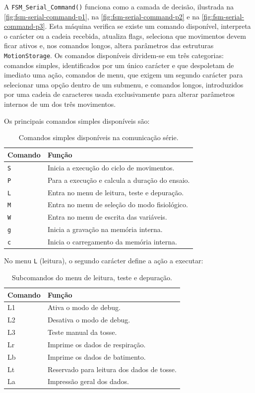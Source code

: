 \clearpage
A \texttt{FSM\_Serial\_Command()} funciona como a camada de decisão, ilustrada na \cref{fig:fsm-serial-command-p1}, na \cref{fig:fsm-serial-command-p2} e na \cref{fig:fsm-serial-command-p3}. Esta máquina verifica se existe um comando disponível, interpreta o carácter ou a cadeia recebida, atualiza flags, seleciona que movimentos devem ficar ativos e, nos comandos longos, altera parâmetros das estruturas \texttt{MotionStorage}. Os comandos disponíveis dividem-se em três categorias: comandos simples, identificados por um único carácter e que despoletam de imediato uma ação, comandos de menu, que exigem um segundo carácter para selecionar uma opção dentro de um submenu, e comandos longos, introduzidos por uma cadeia de caracteres usada exclusivamente para alterar parâmetros internos de um dos três movimentos.

Os principais comandos simples disponíveis são:

\begin{table}[H]
  \centering
  \caption{Comandos simples disponíveis na comunicação série.}
  \label{tab:comandos-simples}
  \begin{tabular}{@{}ll@{}}
    \toprule
    Comando & Função\\
    \midrule
    \texttt{S} & Inicia a execução do ciclo de movimentos.\\
    \texttt{P} & Para a execução e calcula a duração do ensaio.\\
    \texttt{L} & Entra no menu de leitura, teste e depuração.\\
    \texttt{M} & Entra no menu de seleção do modo fisiológico.\\
    \texttt{W} & Entra no menu de escrita das variáveis.\\
    \texttt{g} & Inicia a gravação na memória interna.\\
    \texttt{c} & Inicia o carregamento da memória interna.\\
    \bottomrule
  \end{tabular}
\end{table}

No menu \texttt{L} (leitura), o segundo carácter define a ação a executar:

\begin{table}[H]
  \centering
  \caption{Subcomandos do menu de leitura, teste e depuração.}
  \label{tab:comandos-leitura}
  \begin{tabular}{@{}>{\ttfamily}lp{10.2cm}@{}}
    \toprule
    \normalfont Comando & Função\\
    \midrule
    L1 & Ativa o modo de debug.\\
    L2 & Desativa o modo de debug.\\
    L3 & Teste manual da tosse.\\
    Lr & Imprime os dados de respiração.\\
    Lb & Imprime os dados de batimento.\\
    Lt & Reservado para leitura dos dados de tosse.\\
    La & Impressão geral dos dados.\\
    \bottomrule
  \end{tabular}
\end{table}

